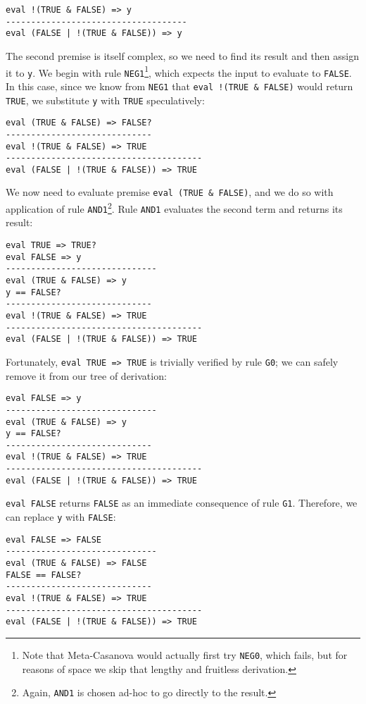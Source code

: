 \begin{lstlisting}
eval !(TRUE & FALSE) => y
------------------------------------
eval (FALSE | !(TRUE & FALSE)) => y
\end{lstlisting}

The second premise is itself complex, so we need to find its result and then assign it to \texttt{y}. We begin with rule \texttt{NEG1}\footnote{Note that Meta-Casanova would actually first try \texttt{NEG0}, which fails, but for reasons of space we skip that lengthy and fruitless derivation.}, which expects the input to evaluate to \texttt{FALSE}. In this case, since we know from \texttt{NEG1} that \texttt{eval !(TRUE \& FALSE)} would return \texttt{TRUE}, we substitute \texttt{y} with \texttt{TRUE} speculatively:

\begin{lstlisting}
eval (TRUE & FALSE) => FALSE?
-----------------------------
eval !(TRUE & FALSE) => TRUE
---------------------------------------
eval (FALSE | !(TRUE & FALSE)) => TRUE
\end{lstlisting}

We now need to evaluate premise \texttt{eval (TRUE \& FALSE)}, and we do so with application of rule \texttt{AND1}\footnote{Again, \texttt{AND1} is chosen ad-hoc to go directly to the result.}. Rule \texttt{AND1} evaluates the second term and returns its result:

\begin{lstlisting}
eval TRUE => TRUE?
eval FALSE => y
------------------------------
eval (TRUE & FALSE) => y
y == FALSE?
-----------------------------
eval !(TRUE & FALSE) => TRUE
---------------------------------------
eval (FALSE | !(TRUE & FALSE)) => TRUE
\end{lstlisting}

Fortunately, \texttt{eval TRUE => TRUE} is trivially verified by rule \texttt{G0}; we can safely remove it from our tree of derivation:

\begin{lstlisting}
eval FALSE => y
------------------------------
eval (TRUE & FALSE) => y
y == FALSE?
-----------------------------
eval !(TRUE & FALSE) => TRUE
---------------------------------------
eval (FALSE | !(TRUE & FALSE)) => TRUE
\end{lstlisting}

\texttt{eval FALSE} returns \texttt{FALSE} as an immediate consequence of rule \texttt{G1}. Therefore, we can replace \texttt{y} with \texttt{FALSE}:

\begin{lstlisting}
eval FALSE => FALSE
------------------------------
eval (TRUE & FALSE) => FALSE
FALSE == FALSE?
-----------------------------
eval !(TRUE & FALSE) => TRUE
---------------------------------------
eval (FALSE | !(TRUE & FALSE)) => TRUE
\end{lstlisting}

